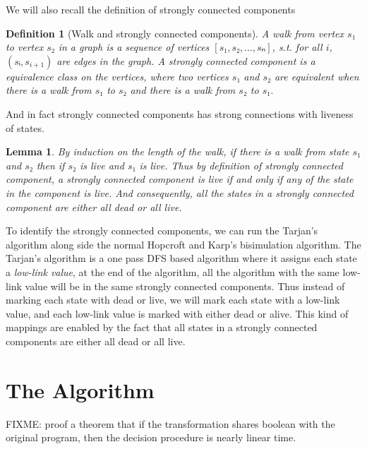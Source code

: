 \documentclass[acmsmall,screen]{acmart}
\newtheorem{lemma}{Lemma}
\newtheorem{definition}{Definition}
\begin{document}
We will also recall the definition of strongly connected components 
\begin{definition}[Walk and strongly connected components]
    A walk from vertex \(s₁\) to vertex \(s₂\) in a graph is a sequence of vertices \([s₁, s₂, …, sₙ]\), s.t. for all \(i\), \((sᵢ, s_{i + 1})\) are edges in the graph.
    A strongly connected component is a equivalence class on the vertices, where two vertices \(s₁\) and \(s₂\) are equivalent when there is a walk from \(s₁\) to \(s₂\) and there is a walk from \(s₂\) to \(s₁\).
\end{definition}

And in fact strongly connected components has strong connections with liveness of states.

\begin{lemma}
    By induction on the length of the walk, if there is a walk from state \(s₁\) and \(s₂\) then if \(s₂\) is live and \(s₁\) is live. 
    Thus by definition of strongly connected component, a strongly connected component is live if and only if any of the state in the component is live. 
    And consequently, all the states in a strongly connected component are either all dead or all live.
\end{lemma}

To identify the strongly connected components, we can run the Tarjan's algorithm along side the normal Hopcroft and Karp's bisimulation algorithm.
The Tarjan's algorithm is a one pass DFS based algorithm where it assigns each state a \emph{low-link value}, at the end of the algorithm, all the algorithm with the same low-link value will be in the same strongly connected components. 
Thus instead of marking each state with dead or live, we will mark each state with a low-link value, and each low-link value is marked with either dead or alive.
This kind of mappings are enabled by the fact that all states in a strongly connected components are either all dead or all live.

\section{The Algorithm}





FIXME: proof a theorem that if the transformation shares boolean with the original program, then the decision procedure is nearly linear time. 




\end{document}
